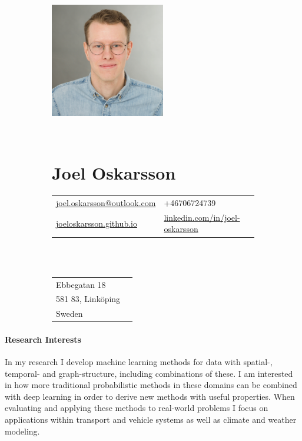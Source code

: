 \documentclass[12pt]{article}
\makeatletter
\newcommand{\email}{joel.oskarsson@outlook.com}
\newcommand{\cvheading}[1]{\subsection*{#1}}
\makeatother
\begin{document}
\begin{figure}
    \begin{subfigure}[]{0.3\textwidth}
        \includegraphics[height=5cm]{photo}
    \end{subfigure}%
    ~
    \begin{subfigure}[]{0.5\textwidth}
        \part*{Joel Oskarsson}

        \begin{tabular}{l l}
            \href{mailto:\email}{\email} & +46706724739\\
            \href{http://joeloskarsson.github.io}{joeloskarsson.github.io} & \href{http://linkedin.com/in/joel-oskarsson}{linkedin.com/in/joel-oskarsson}\\
        \end{tabular}
        \\
        \\

        \begin{tabular}{l l}
            Ebbegatan 18 & \\
            581 83, Linköping & \\
            Sweden & \\
        \end{tabular}

     \end{subfigure}%
\end{figure}

\cvheading{Research Interests} %
In my research I develop machine learning methods for data with spatial-, temporal- and graph-structure, including combinations of these.
I am interested in how more traditional probabilistic methods in these domains can be combined with deep learning in order to derive new methods with useful properties.
When evaluating and applying these methods to real-world problems I focus on applications within transport and vehicle systems as well as climate and weather modeling.
\end{document}
